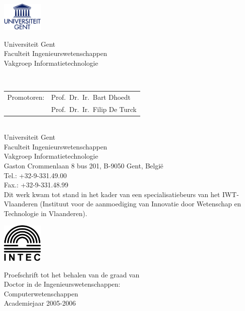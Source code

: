 \documentclass[10pt,a4paper,twoside,dutch,english]{book}                %
\begin{document}

\clearpage{\pagestyle{empty}\cleardoublepage}
\thispagestyle{empty}

\normalsize

\noindent
\begin{minipage}{3cm}%
  \includegraphics*[width=2cm]{UGentlogo}%
\end{minipage}\hfill
\begin{minipage}{8cm}
\raggedleft
\textsf{Universiteit Gent\\
Faculteit Ingenieurswetenschappen\\
Vakgroep Informatietechnologie}
\end{minipage}
\\[2cm]

\noindent \begin{tabular}{ @{} l l}
Promotoren: & Prof.\ Dr.\ Ir.\ Bart Dhoedt \\
 & Prof.\ Dr.\ Ir.\ Filip De Turck \\
\end{tabular}
\\[2cm]

\noindent Universiteit Gent \\
\noindent Faculteit Ingenieurswetenschappen
\\[0.3cm]
\noindent Vakgroep Informatietechnologie \\
\noindent Gaston Crommenlaan 8 bus 201,
\noindent B-9050 Gent, Belgi\"e 
\\[0.3cm]
\noindent Tel.: +32-9-331.49.00\\
\noindent Fax.: +32-9-331.48.99
\\[4cm]
\noindent Dit werk kwam tot stand in het kader van een specialisatiebeurs van het IWT-Vlaanderen (Instituut voor de aanmoediging van Innovatie door Wetenschap en Technologie in Vlaanderen).

\vfill

\begin{minipage}{2.0cm}%
    \includegraphics*[width=2.0cm]{intec}%
\end{minipage}\hfill
\begin{minipage}{9cm}
\raggedleft
\textsf{Proefschrift tot het behalen van de graad van \\
Doctor in de Ingenieurswetenschappen: \\
Computerwetenschappen \\
Academiejaar 2005-2006}
\end{minipage}
\clearpage{\pagestyle{empty}\cleardoublepage}
\end{document}
